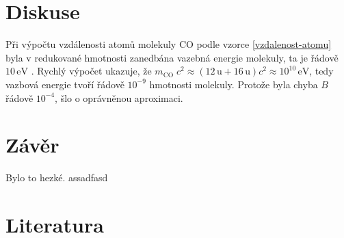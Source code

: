 \documentclass[10pt,a4paper]{article}
\renewcommand{\U}[1]{\ensuremath{\,\mathrm{#1}}}
\newcommand{\°}{\degree}
\begin{document}
\pagebreak


\section{Diskuse}
Při výpočtu vzdálenosti atomů molekuly CO podle vzorce \eqref{vzdalenost-atomu} byla v redukované hmotnosti zanedbána vazebná energie molekuly, ta je řádově $10 \U{eV}$ \cite{wiki:carbon-monoxide}. Rychlý výpočet ukazuje, že $m_\mathrm{CO} \; c^2 \approx (12\U{u} + 16\U{u})c^2 \approx 10^{10} \U{eV}$, tedy vazbová energie tvoří řádově $10^{-9}$ hmotnosti molekuly. Protože byla chyba $B$ řádově $10^{-4}$, šlo o oprávněnou aproximaci.


\section{Závěr}
Bylo to hezké. assadfasd

\section{Literatura}
 

 
\end{document}

